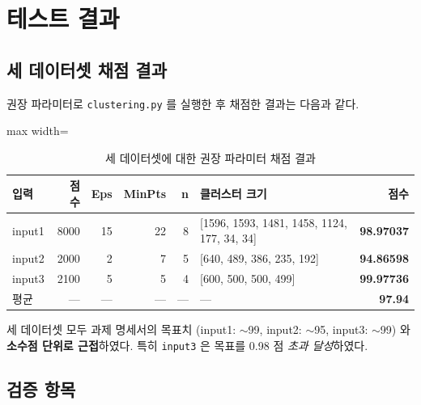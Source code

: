 \documentclass[12pt, a4paper]{article}
\begin{document}
\section{테스트 결과}

\subsection{세 데이터셋 채점 결과}

권장 파라미터로 \texttt{clustering.py} 를 실행한 후 채점한 결과는 다음과 같다.

\begin{table}[h]
\centering
\begin{adjustbox}{max width=\textwidth}
\begin{tabular}{lrrrrlr}
\toprule
\textbf{입력} & \textbf{점 수} & \textbf{Eps} & \textbf{MinPts} & \textbf{n} & \textbf{클러스터 크기} & \textbf{점수} \\
\midrule
input1 & 8000 & 15 & 22 & 8 & [1596, 1593, 1481, 1458, 1124, 177, 34, 34] & \textbf{98.97037} \\
input2 & 2000 &  2 &  7 & 5 & [640, 489, 386, 235, 192]                  & \textbf{94.86598} \\
input3 & 2100 &  5 &  5 & 4 & [600, 500, 500, 499]                       & \textbf{99.97736} \\
\midrule
평균 & — & — & — & — & — & \textbf{97.94} \\
\bottomrule
\end{tabular}
\end{adjustbox}
\caption{세 데이터셋에 대한 권장 파라미터 채점 결과}
\end{table}

세 데이터셋 모두 과제 명세서의 목표치 (input1: $\sim$99, input2: $\sim$95, input3: $\sim$99) 와 \textbf{소수점 단위로 근접}하였다. 특히 \texttt{input3} 은 목표를 0.98 점 \emph{초과 달성}하였다.

\subsection{검증 항목}
\end{document}
